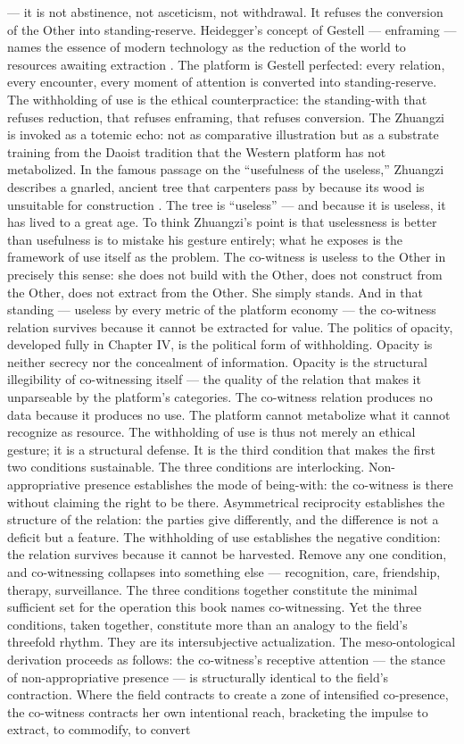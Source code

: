 — it is not abstinence, not asceticism, not withdrawal. It refuses the conversion of the Other into standing-reserve. Heidegger’s concept of Gestell — enframing — names the essence of modern technology as the reduction of the world to resources awaiting extraction \cite{heidegger_1953}. The platform is Gestell perfected: every relation, every encounter, every moment of attention is converted into standing-reserve. The withholding of use is the ethical counterpractice: the standing-with that refuses reduction, that refuses enframing, that refuses conversion. The Zhuangzi is invoked as a totemic echo: not as comparative illustration but as a substrate training from the Daoist tradition that the Western platform has not metabolized. In the famous passage on the “usefulness of the useless,” Zhuangzi describes a gnarled, ancient tree that carpenters pass by because its wood is unsuitable for construction \cite[ch.~1]{zhuangzi_2009}. The tree is “useless” — and because it is useless, it has lived to a great age. To think Zhuangzi’s point is that uselessness is better than usefulness is to mistake his gesture entirely; what he exposes is the framework of use itself as the problem. The co-witness is useless to the Other in precisely this sense: she does not build with the Other, does not construct from the Other, does not extract from the Other. She simply stands. And in that standing — useless by every metric of the platform economy — the co-witness relation survives because it cannot be extracted for value. The politics of opacity, developed fully in Chapter IV, is the political form of withholding. Opacity is neither secrecy nor the concealment of information. Opacity is the structural illegibility of co-witnessing itself — the quality of the relation that makes it unparseable by the platform’s categories. The co-witness relation produces no data because it produces no use. The platform cannot metabolize what it cannot recognize as resource. The withholding of use is thus not merely an ethical gesture; it is a structural defense. It is the third condition that makes the first two conditions sustainable. The three conditions are interlocking. Non-appropriative presence establishes the mode of being-with: the co-witness is there without claiming the right to be there. Asymmetrical reciprocity establishes the structure of the relation: the parties give differently, and the difference is not a deficit but a feature. The withholding of use establishes the negative condition: the relation survives because it cannot be harvested. Remove any one condition, and co-witnessing collapses into something else — recognition, care, friendship, therapy, surveillance. The three conditions together constitute the minimal sufficient set for the operation this book names co-witnessing. Yet the three conditions, taken together, constitute more than an analogy to the field’s threefold rhythm. They are its intersubjective actualization. The meso-ontological derivation proceeds as follows: the co-witness’s receptive attention — the stance of non-appropriative presence — is structurally identical to the field’s contraction. Where the field contracts to create a zone of intensified co-presence, the co-witness contracts her own intentional reach, bracketing the impulse to extract, to commodify, to convert 
